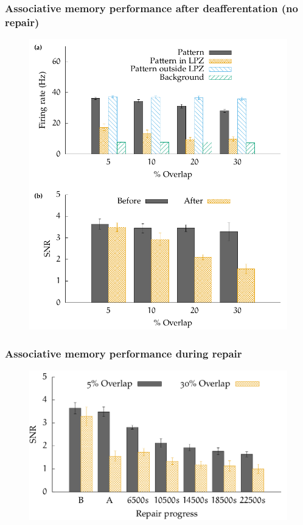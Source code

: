 \begin{frame}[c]
  \frametitle{Associative memory performance after deafferentation (no repair)}
  \begin{figure}[h]
    \centering
    \includegraphics[width=0.6\linewidth]{99_images/performance-deaff-only}
  \end{figure}
\end{frame}
\begin{frame}[c]
  \frametitle{Associative memory performance during repair}
  \begin{figure}[h]
    \centering
    \includegraphics[width=0.6\linewidth]{99_images/performance-during-repair}
  \end{figure}
\end{frame}


